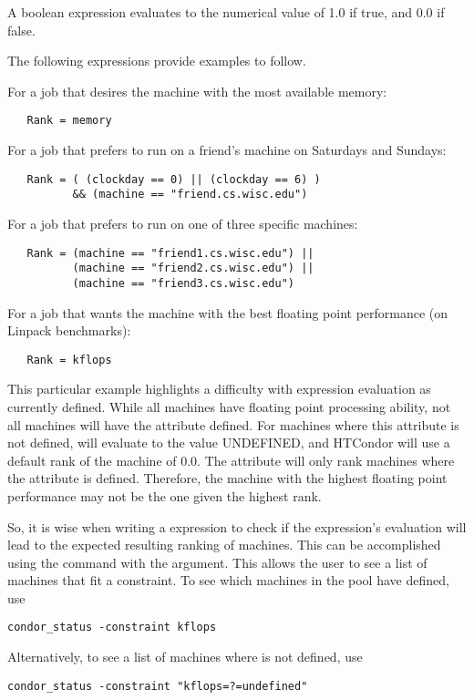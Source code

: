 A boolean expression evaluates to the numerical value of 1.0
if true, and 0.0 if false.

The following  expressions provide examples to
follow.

For a job that desires the machine with the most available memory:
\begin{verbatim}
   Rank = memory
\end{verbatim}

For a job that prefers to run on a friend's machine
on Saturdays and Sundays:
\begin{verbatim}
   Rank = ( (clockday == 0) || (clockday == 6) )
          && (machine == "friend.cs.wisc.edu")
\end{verbatim}

For a job that prefers to run on one of three specific machines:
\begin{verbatim}
   Rank = (machine == "friend1.cs.wisc.edu") ||
          (machine == "friend2.cs.wisc.edu") ||
          (machine == "friend3.cs.wisc.edu")
\end{verbatim}

For a job that wants the machine with the best floating point
performance (on Linpack benchmarks):
\begin{verbatim}
   Rank = kflops
\end{verbatim}
This particular example highlights a difficulty with  expression
evaluation as currently defined.
While all machines have floating point processing ability,
not all machines will have the  attribute defined.
For machines where this attribute is not defined,
 will evaluate to the value UNDEFINED, and
HTCondor will use a default rank of the machine of 0.0.
The  attribute will only rank machines where
the attribute is defined.
Therefore, the machine with the highest floating point
performance may not be the one given the highest rank.

So, it is wise when writing a  expression to check
if the expression's evaluation will lead to the expected
resulting ranking of machines.
This can be accomplished using the  command with the
 argument.  This allows the user to see a list of
machines that fit a constraint.
To see which machines in the pool have  defined,
use
\begin{verbatim}
condor_status -constraint kflops
\end{verbatim}
Alternatively, to see a list of machines where 
 is not defined, use
\begin{verbatim}
condor_status -constraint "kflops=?=undefined"
\end{verbatim}

